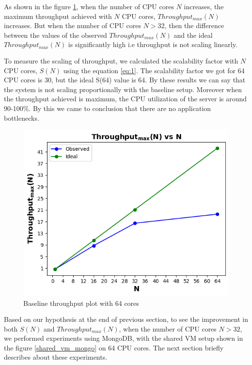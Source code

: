 \documentclass[sigconf]{acmart}
\begin{document}
As shown in the figure \ref{baseline_throughput_64_cores}, when the number of CPU cores $N$ increases, the maximum throughput achieved with $N$ CPU cores, $Throughput_{max}(N)$ increases. But when the number of CPU cores $N>32$,  then the difference between the values of the observed  $Throughput_{max}(N)$  and the ideal $Throughput_{max}(N)$ is significantly high i.e throughput is not scaling linearly.

To measure the scaling of throughput, we calculated the scalability factor with $N$ CPU cores, $S(N)$ using the equation \ref{eq:1}. The scalability factor we got for 64 CPU cores is 30, but the ideal  S(64) value is 64. By these results we can say that the system is not scaling proportionally with the baseline setup. Moreover when the throughput achieved is maximum, the CPU utilization of the server is around 90-100\%. By this we came to conclusion that there are no application bottlenecks. 

\begin{figure}[!htb]
  \centering
  \includegraphics[width=\linewidth]{Pictures/baseline_64_cores.png}
  \caption{Baseline throughput plot with 64 cores}
  \label{baseline_throughput_64_cores}
\end{figure}

Based on our hypothesis at the end of previous section, to see the improvement in both  $S(N)$ and $Throughput_{max}(N)$, when the number of CPU cores $N>32$, we performed experiments using MongoDB, with the shared VM setup shown in the figure \ref{shared_vm_mongo} on 64 CPU cores. The next section briefly describes about these experiments.
\end{document}
